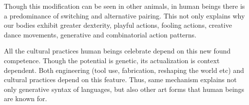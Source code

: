 Though this modification can be seen in other animals, in human beings there is a predominance of switching and alternative pairing. This not only explains why our bodies exhibit greater dexterity, playful actions, fooling actions, creative dance movements, generative and combinatorial action patterns.  

All the cultural practices human beings celebrate depend on this new found competence. Though the potential is genetic, its actualization is context dependent. Both engineering (tool use, fabrication, reshaping the world etc) and cultural practices depend on this feature. Thus, same mechanism explains not only generative syntax of languages, but also other art forms that human beings are known for. 

